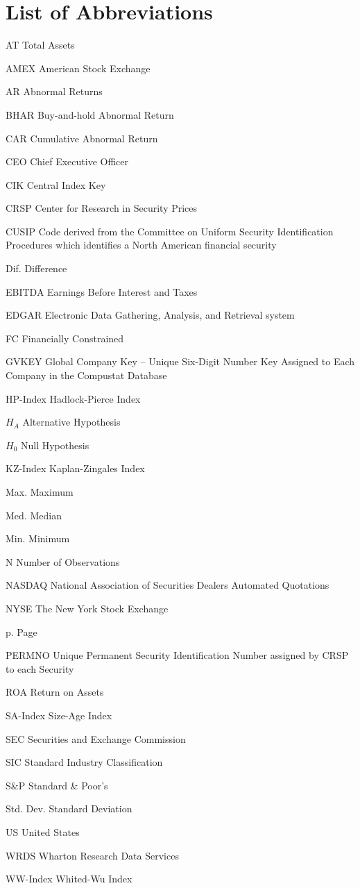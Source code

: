 \documentclass[12pt]{article}
\newcommand{\abbrlabel}[1]{\makebox[7cm][l]{#1\ \dotfill}}
\newenvironment{abbreviations}{\begin{list}{}{\renewcommand{\makelabel}{\abbrlabel}\setlength{\labelwidth}{7cm}\setlength{\leftmargin}{\labelwidth+\labelsep}%
\setlength{\itemsep}{0pt}}}{\end{list}}
\begin{document}
\section*{List of Abbreviations}
\begin{abbreviations}
	\item[AT] Total Assets
	\item[AMEX] American Stock Exchange
	\item[AR] Abnormal Returns
	\item[BHAR] Buy-and-hold Abnormal Return
	\item[CAR] Cumulative Abnormal Return
	\item[CEO] Chief Executive Officer
	\item[CIK] Central Index Key
	\item[CRSP] Center for Research in Security Prices
	\item[CUSIP] Code derived from the Committee on Uniform Security Identification Procedures which identifies a North American financial security
	\item[Dif.] Difference
	\item[EBITDA] Earnings Before Interest and Taxes
	\item[EDGAR] Electronic Data Gathering, Analysis, and Retrieval system
	\item[FC] Financially Constrained
	\item[GVKEY] Global Company Key -- Unique Six-Digit Number Key Assigned to Each Company in the Compustat Database
	\item[HP-Index] Hadlock-Pierce Index
	\item[$H_{A}$] Alternative Hypothesis 
	\item[$H_{0}$] Null Hypothesis 
	\item[KZ-Index] Kaplan-Zingales Index
	\item[Max.] Maximum
	\item[Med.] Median
	\item[Min.] Minimum
	\item[N] Number of Observations
	\item[NASDAQ] National Association of Securities Dealers Automated Quotations
	\item[NYSE] The New York Stock Exchange
	\item[p.] Page
	\item[PERMNO] Unique Permanent Security Identification Number assigned by CRSP to each Security
	\item[ROA] Return on Assets
	\item[SA-Index] Size-Age Index
	\item[SEC] Securities and Exchange Commission
	\item[SIC] Standard Industry Classification
	\item[S\&P] Standard \& Poor's
	\item[Std. Dev.] Standard Deviation
	\item[US] United States
	\item[WRDS] Wharton Research Data Services
	\item[WW-Index] Whited-Wu Index
\end{abbreviations}
\end{document}
